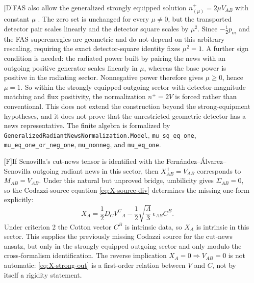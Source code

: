 \documentclass[11pt,a4paper]{article}
\newcommand{\statusD}{\textsf{[D]}}
\newcommand{\statusF}{\textsf{[F]}}
\begin{document}
\statusD FAS also allow the generalized strongly equipped solution \(n^+_{(\mu)}=2\mu V_{AB}\) with constant \(\mu\) \cite{fabSen2022asymptotic}.  The zero set is unchanged for every \(\mu\neq0\), but the transported detector pair scales linearly and the detector square scales by \(\mu^2\).  Since \(-\tfrac12p_m\) and the FAS superenergies are geometric and do not depend on this arbitrary rescaling, requiring the exact detector-square identity fixes \(\mu^2=1\).  A further sign condition is needed: the radiated power built by pairing the news with an outgoing positive generator scales linearly in \(\mu\), whereas the base power is positive in the radiating sector.  Nonnegative power therefore gives \(\mu\ge0\), hence \(\mu=1\).  So within the strongly equipped outgoing sector with detector-magnitude matching and flux positivity, the normalization \(n^+=2V\) is forced rather than conventional.  This does not extend the construction beyond the strong-equipment hypotheses, and it does not prove that the unrestricted geometric detector has a news representative.  The finite algebra is formalized by \texttt{GeneralizedRadiantNewsNormalization.Model}, \texttt{mu\_sq\_eq\_one}, \texttt{mu\_eq\_one\_or\_neg\_one}, \texttt{mu\_nonneg}, and \texttt{mu\_eq\_one}.

\statusF If Senovilla's cut-news tensor is identified with the Fernández--Álvarez--Senovilla outgoing radiant news in this sector, then \(X^+_{AB}=V_{AB}\) corresponds to \(M_{AB}=V_{AB}\).  Under this natural but unproved bridge, umbilicity gives \(\Sigma_{AB}=0\), so the Codazzi-source equation \eqref{eq:X-source-div} determines the missing one-form explicitly:
\begin{equation}\label{eq:X-strong-out}
  X_A
  =
  \frac12 D_C V^C{}_A
  -
  \frac12\sqrt{\frac{\Lambda}{3}}\,\epsilon_{AB}C^B .
\end{equation}
Under criterion 2 the Cotton vector \(C^B\) is intrinsic data, so \(X_A\) is intrinsic in this sector.  This supplies the previously missing Codazzi source for the cut-news ansatz, but only in the strongly equipped outgoing sector and only modulo the cross-formalism identification.  The reverse implication \(X_A=0\Rightarrow V_{AB}=0\) is not automatic: \eqref{eq:X-strong-out} is a first-order relation between \(V\) and \(C\), not by itself a rigidity statement.
\end{document}
